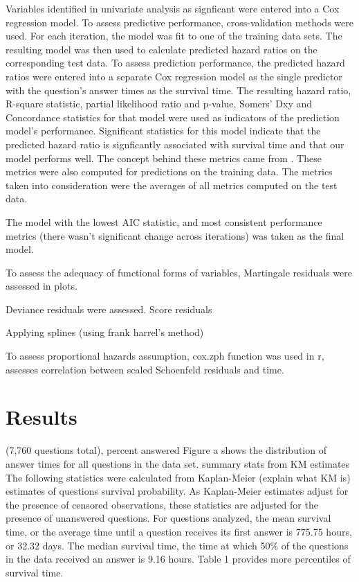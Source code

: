 \documentclass[12pt]{article}
\begin{document}
Variables identified in univariate analysis as signficant were entered into a Cox regression model. To assess predictive performance, cross-validation methods were used. For each iteration, the model was fit to one of the training data sets. The resulting model was then used to calculate predicted hazard ratios on the corresponding test data. To assess prediction performance, the predicted hazard ratios were entered into a separate Cox regression model as the single predictor with the question's answer times as the survival time. The resulting hazard ratio, R-square statistic, partial likelihood ratio and p-value, Somers' Dxy and Concordance statistics for that model were used as indicators of the prediction model's performance. Significant statistics for this model indicate that the predicted hazard ratio is signficantly associated with survival time and that our model performs well. The concept behind these metrics came from \cite{Chen}. These metrics were also computed for predictions on the training data. The metrics taken into consideration were the averages of all metrics computed on the test data. 


The model with the lowest AIC statistic, and most consistent performance metrics (there wasn't significant change across iterations) was taken as the final model. 

To assess the adequacy of functional forms of variables, Martingale residuals were assessed in plots. 

Deviance residuals were assessed. Score residuals 

Applying splines (using frank harrel's method) 

To assess proportional hazards assumption, cox.zph function was used in r, assesses correlation between scaled Schoenfeld residuals and time. 

  
\section{Results} 
(7,760 questions total), percent answered 
Figure a shows the distribution of answer times for all questions in the data set. 
summary stats from KM estimates
    The following statistics were calculated from Kaplan-Meier (explain what KM is) estimates of questions survival probability. As Kaplan-Meier estimates adjust for the presence of censored observations, these statistics are adjusted for the presence of unanswered questions. For questions analyzed, the mean survival time, or the average time until a question receives its first answer is 775.75 hours, or 32.32 days. The median survival time, the time at which 50\% of the questions in the data received an answer is 9.16 hours. Table 1 provides more percentiles of survival time. 
    
\end{document}
